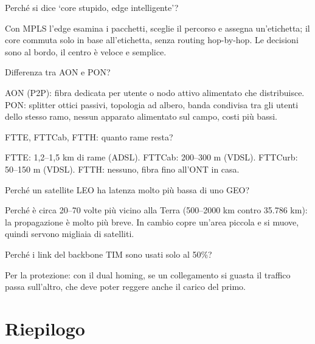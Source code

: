 \begin{approfondimento}{Perché si dice `core stupido, edge intelligente'?}

Con MPLS l'edge esamina i pacchetti, sceglie il percorso e assegna un'etichetta; il core commuta solo in base all'etichetta, senza routing hop-by-hop. Le decisioni sono al bordo, il centro è veloce e semplice.

\end{approfondimento}

\begin{approfondimento}{Differenza tra AON e PON?}

AON (P2P): fibra dedicata per utente o nodo attivo alimentato che distribuisce. PON: splitter ottici passivi, topologia ad albero, banda condivisa tra gli utenti dello stesso ramo, nessun apparato alimentato sul campo, costi più bassi.

\end{approfondimento}

\begin{approfondimento}{FTTE, FTTCab, FTTH: quanto rame resta?}

FTTE: 1,2--1,5 km di rame (ADSL). FTTCab: 200--300 m (VDSL). FTTCurb: 50--150 m (VDSL). FTTH: nessuno, fibra fino all'ONT in casa.

\end{approfondimento}

\begin{approfondimento}{Perché un satellite LEO ha latenza molto più bassa di uno GEO?}

Perché è circa 20--70 volte più vicino alla Terra (500--2000 km contro 35.786 km): la propagazione è molto più breve. In cambio copre un'area piccola e si muove, quindi servono migliaia di satelliti.

\end{approfondimento}

\begin{approfondimento}{Perché i link del backbone TIM sono usati solo al 50\%?}

Per la protezione: con il dual homing, se un collegamento si guasta il traffico passa sull'altro, che deve poter reggere anche il carico del primo.

\end{approfondimento}

\section{Riepilogo}

